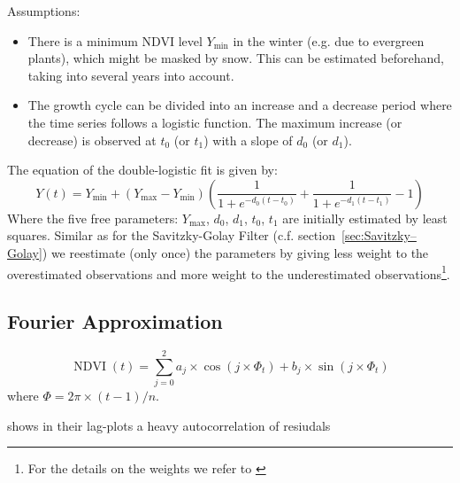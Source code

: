 Assumptions:
\begin{itemize}
    \item There is a minimum NDVI level $Y_{\min}$ in the winter (e.g. due to evergreen plants), which might be masked by snow. This can be estimated beforehand, taking into several years into account.
    \item The growth cycle can be divided into an increase and a decrease period where the time series follows a logistic function. The maximum increase (or decrease) is observed at $t_0$ (or $t_1$) with a slope of $d_0$ (or $d_1$).
\end{itemize}

The equation of the double-logistic fit is given by:
\begin{equation*}
    Y(t) = Y_{\min} + \left(Y_{\max}-Y_{\min}\right)\left(\frac{1}{1+e^{-d_0(t-t_0)}}+\frac{1}{1+e^{-d_1(t-t_1)}}-1\right)
\end{equation*}
Where the five free parameters: $Y_{\max}$, $d_0$, $d_1$, $t_0$, $t_1$ are initially estimated by least squares. Similar as for the Savitzky-Golay Filter (c.f. section~\ref{sec:Savitzky–Golay}) we reestimate (only once) the parameters by giving less weight to the overestimated observations and more weight to the underestimated observations\footnote{For the details on the weights we refer to \cite{beckImprovedMonitoringVegetation2006}}.

\subsection{Fourier Approximation}
\label{sec:fourier_approx}
$$
    \operatorname{NDVI}(t)=\sum_{j=0}^{2} a_{j} \times \cos \left(j \times \Phi_{t}\right)+b_{j} \times \sin \left(j \times \Phi_{t}\right)
$$
where $\Phi=2 \pi \times(t-1) / n$.

\cite{beckImprovedMonitoringVegetation2006} shows in their lag-plots a heavy autocorrelation of resiudals



